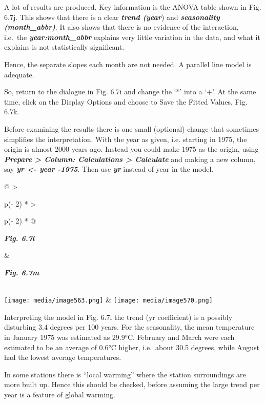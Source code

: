 \documentclass[
  letterpaper,
  DIV=11,
  numbers=noendperiod]{scrreprt}
\begin{document}
A lot of results are produced. Key information is the ANOVA table shown
in Fig. 6.7j. This shows that there is a clear \textbf{\emph{trend
(year}}) and \textbf{\emph{seasonality (month\_abbr)}}. It also shows
that there is no evidence of the interaction, i.e.~the
\textbf{\emph{year:month\_abbr}} explains very little variation in the
data, and what it explains is not statistically significant.

Hence, the separate slopes each month are not needed. A parallel line
model is adequate.

So, return to the dialogue in Fig. 6.7i and change the `*' into a `+'.
At the same time, click on the Display Options and choose to Save the
Fitted Values, Fig. 6.7k.

Before examining the results there is one small (optional) change that
sometimes simplifies the interpretation. With the year as given, i.e.
starting in 1975, the origin is almost 2000 years ago. Instead you could
make 1975 as the origin, using \textbf{\emph{Prepare \textgreater{}
Column: Calculations \textgreater{} Calculate}} and making a new column,
say \textbf{\emph{yr \textless- year -1975}}. Then use
\textbf{\emph{yr}} instead of year in the model.

\begin{longtable}[]{@{}
  >{\raggedright\arraybackslash}p{(\columnwidth - 2\tabcolsep) * }
  >{\raggedright\arraybackslash}p{(\columnwidth - 2\tabcolsep) * }@{}}
\toprule\noalign{}
\begin{minipage}[b]{\linewidth}\raggedright
\textbf{\emph{Fig. 6.7l}}
\end{minipage} & \begin{minipage}[b]{\linewidth}\raggedright
\textbf{\emph{Fig. 6.7m}}
\end{minipage} \\
\midrule\noalign{}
\endhead
\bottomrule\noalign{}
\endlastfoot
\texttt{[image: media/image563.png]} &
\texttt{[image: media/image570.png]} \\
\end{longtable}

Interpreting the model in Fig. 6.7l the trend (yr coefficient) is a
possibly disturbing 3.4 degrees per 100 years. For the seasonality, the
mean temperature in January 1975 was estimated as 29.9°C. February and
March were each estimated to be an average of 0.6°C higher, i.e.~about
30.5 degrees, while August had the lowest average temperatures.

In some stations there is ``local warming'' where the station
surroundings are more built up. Hence this should be checked, before
assuming the large trend per year is a feature of global warming.
\end{document}
